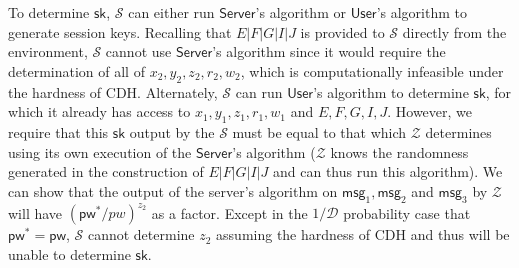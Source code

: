 \documentclass[12pt,a4paper]{article}
\newcommand{\simulator}{\mathcal{S}}
\newcommand{\env}{\mathcal{Z}}
\newcommand{\user}{\mathsf{User}}
\newcommand{\sk}{\mathsf{sk}}
\newcommand{\pw}{\mathsf{pw}}
\newcommand{\server}{\mathsf{Server}}
\newcommand{\msg}[1]{\mathsf{msg}_{#1}}
\begin{document}
	To determine $\sk$, $\simulator$ can either run $\server$'s algorithm or $\user$'s algorithm to generate session keys. Recalling that $E|F|G|I|J$ is provided to $\simulator$ directly from the environment, $\simulator$ cannot use $\server$'s algorithm since it would require the determination of all of $x_2, y_2, z_2, r_2, w_2$, which is computationally infeasible under the hardness of CDH. Alternately, $\simulator$ can run $\user$'s algorithm to determine $\sk$, for which it already has access to $x_1,y_1,z_1,r_1,w_1$ and $E,F,G,I,J$. However, we require that this $\sk$ output by the $\simulator$ must be equal to that which $\env$ determines using its own execution of the $\server$'s algorithm ($\env$ knows the randomness generated in the construction of $E|F|G|I|J$ and can thus run this algorithm). We can show that the output of the server's algorithm on $\msg{1},\msg{2}$ and $\msg{3}$ by $\env$ will have $(\pw^{*}/pw)^{z_2}$ as a factor. Except in the $1/\mathcal{D}$ probability case that $\pw^{*}=\pw$, $\simulator$ cannot determine $z_2$ assuming the hardness of CDH and thus will be unable to determine $\sk$.
	
	
	
	\pagebreak
	\appendix
	
%	
%	
	
\end{document}
